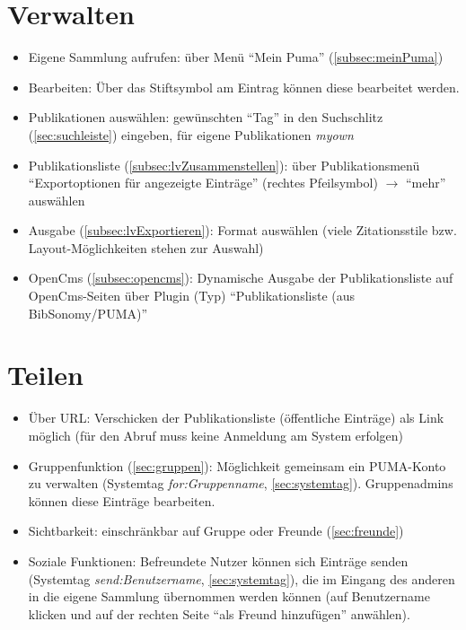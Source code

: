 \section{Verwalten}
\label{sec:verwalten}
\begin{itemize}
\item Eigene Sammlung aufrufen: über Menü \enquote{Mein Puma} (\autoref{subsec:meinPuma})
\item Bearbeiten: Über das Stiftsymbol am Eintrag können diese bearbeitet werden.
\item Publikationen auswählen: gewünschten \enquote{Tag} in den Suchschlitz (\autoref{sec:suchleiste}) eingeben, für eigene Publikationen \textit{myown}
\item Publikationsliste (\autoref{subsec:lvZusammenstellen}): über Publikationsmenü \enquote{Exportoptionen für angezeigte Einträge}  (rechtes Pfeilsymbol) $\to$ \enquote{mehr} auswählen
\item Ausgabe (\autoref{subsec:lvExportieren}): Format auswählen (viele Zitationsstile bzw. Layout-Möglichkeiten stehen zur Auswahl)
\item OpenCms (\autoref{subsec:opencms}): Dynamische Ausgabe der Publikationsliste auf OpenCms-Seiten über Plugin (Typ) \enquote{Publikationsliste (aus BibSonomy/PUMA)}
\end{itemize}

\section{Teilen}
\label{sec:teilen}
\begin{itemize}
\item Über URL: Verschicken der Publikationsliste (öffentliche Einträge) als Link möglich (für den Abruf muss keine Anmeldung am System erfolgen)
\item Gruppenfunktion (\autoref{sec:gruppen}): Möglichkeit gemeinsam ein PUMA-Konto zu verwalten (Systemtag \textit{for:Gruppenname}, \autoref{sec:systemtag}). Gruppenadmins können diese Einträge bearbeiten.
\item Sichtbarkeit: einschränkbar auf Gruppe oder Freunde (\autoref{sec:freunde})
\item Soziale Funktionen: Befreundete Nutzer können sich Einträge senden (Systemtag \textit{send:Benutzername}, \autoref{sec:systemtag}), die im Eingang des anderen in die eigene Sammlung übernommen werden können (auf Benutzername klicken und auf der rechten Seite \enquote{als Freund hinzufügen} anwählen).
\end{itemize}
\newpage
